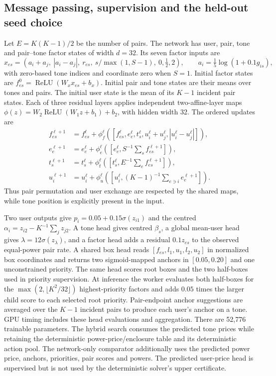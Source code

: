 \subsection{Message passing, supervision and the held-out seed choice}
Let \(E=K(K-1)/2\) be the number of pairs.
The network has user, pair, tone and pair--tone factor states of width
\(d=32\). Its seven factor inputs are
\[
 x_{es}=(a_i+a_j,\ |a_i-a_j|,\ r_{es},\
        s/\max(1,S-1),\ 0,\tfrac12,2),\qquad
 a_i=\tfrac15\log(1+0.1g_{is}),
\]
with zero-based tone indices and coordinate zero when \(S=1\). Initial factor states are
\(f^0_{es}=\operatorname{ReLU}(W_xx_{es}+b_x)\).
Initial pair and tone states are their means over tones and pairs.
The initial user state is the mean of its \(K-1\) incident pair states.
Each of three residual layers applies independent two-affine-layer maps
\(\phi(z)=W_2\operatorname{ReLU}(W_1z+b_1)+b_2\), with hidden width 32.
The ordered updates are
\begin{align*}
 f^{\ell+1}_{es}&=f^\ell_{es}+
 \phi_f^\ell([f^\ell_{es},e^\ell_e,t^\ell_s,
                         u^\ell_i+u^\ell_j,|u^\ell_i-u^\ell_j|]),\\
 e^{\ell+1}_e&=e^\ell_e+
 \phi_e^\ell([e^\ell_e,S^{-1}\textstyle\sum_s f^{\ell+1}_{es}]),\\
 t^{\ell+1}_s&=t^\ell_s+
 \phi_t^\ell([t^\ell_s,E^{-1}\textstyle\sum_e f^{\ell+1}_{es}]),\\
 u^{\ell+1}_i&=u^\ell_i+
 \phi_u^\ell([u^\ell_i,(K-1)^{-1}\textstyle\sum_{e\ni i}e^{\ell+1}_e]).
\end{align*}
Thus pair permutation and user exchange are respected by the shared maps,
while tone position is explicitly present in the input.

Two user outputs give \(p_i=0.05+0.15\sigma(z_{i1})\) and the centred
\(\alpha_i=z_{i2}-K^{-1}\sum_jz_{j2}\).
A tone head gives centred \(\beta_s\), a global mean-user head gives
\(\lambda=12\sigma(z_\lambda)\), and a factor head adds a residual
\(0.1z_{es}\) to the observed equal-power pair rate.
A shared box head reads \([f_{es},l_1,u_1,l_2,u_2]\) in normalized box
coordinates and returns two sigmoid-mapped anchors in \([0.05,0.20]\)
and one unconstrained priority. The same head scores root boxes and
the two half-boxes used in priority supervision. At inference the worker
evaluates both half-boxes for the \(\max(2,\lfloor K^2/32\rfloor)\)
highest-priority factors and adds \(0.05\) times the larger child score
to each selected root priority. Pair-endpoint anchor suggestions are
averaged over the \(K-1\) incident pairs to produce each user's anchor
on a tone. GPU timing includes these head evaluations and aggregation.
There are 52,776 trainable
parameters. The hybrid search consumes the predicted tone prices
while retaining the deterministic power-price/enclosure table and its deterministic
action pool. The network-only comparator additionally uses the predicted
power price, anchors, priorities, pair scores and powers.
The predicted user-price head is supervised but is not used by the
deterministic solver's upper certificate.

